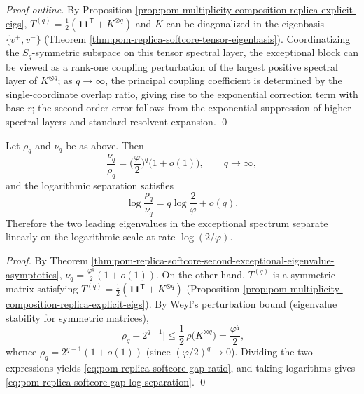 \begin{proof}[Proof outline]
By Proposition \ref{prop:pom-multiplicity-composition-replica-explicit-eigs},
\(
T^{(q)}=\frac12(\mathbf{1}\mathbf{1}^{\mathsf T}+K^{\otimes q})
\)
and \(K\) can be diagonalized in the eigenbasis \(\{v^+,v^-\}\) (Theorem \ref{thm:pom-replica-softcore-tensor-eigenbasis}).
Coordinatizing the \(S_q\)-symmetric subspace on this tensor spectral layer, the exceptional block can be viewed as a rank-one coupling perturbation of the largest positive spectral layer of \(K^{\otimes q}\);
as \(q\to\infty\), the principal coupling coefficient is determined by the single-coordinate overlap ratio, giving rise to the exponential correction term with base \(r\);
the second-order error follows from the exponential suppression of higher spectral layers and standard resolvent expansion. \qed
\end{proof}

\begin{theorem}\label{thm:pom-replica-softcore-gap-ratio-log-separation}
Let \(\rho_q\) and \(\nu_q\) be as above. Then
\begin{equation}\label{eq:pom-replica-softcore-gap-ratio}
\frac{\nu_q}{\rho_q}
=\Big(\frac{\varphi}{2}\Big)^{q}\Big(1+o(1)\Big),
\qquad q\to\infty,
\end{equation}
and the logarithmic separation satisfies
\begin{equation}\label{eq:pom-replica-softcore-gap-log-separation}
\log\frac{\rho_q}{\nu_q}
= q\log\frac{2}{\varphi}+o(q).
\end{equation}
Therefore the two leading eigenvalues in the exceptional spectrum separate linearly on the logarithmic scale at rate \(\log(2/\varphi)\).
\end{theorem}
\begin{proof}
By Theorem \ref{thm:pom-replica-softcore-second-exceptional-eigenvalue-asymptotics},
\(
\nu_q=\frac{\varphi^q}{2}(1+o(1))
\).
On the other hand, \(T^{(q)}\) is a symmetric matrix satisfying
\(
T^{(q)}=\frac12(\mathbf{1}\mathbf{1}^{\mathsf T}+K^{\otimes q})
\)
(Proposition \ref{prop:pom-multiplicity-composition-replica-explicit-eigs}).
By Weyl's perturbation bound (eigenvalue stability for symmetric matrices),
\[
\bigl|\rho_q-2^{q-1}\bigr|
\le \frac12\,\rho\!\bigl(K^{\otimes q}\bigr)
=\frac{\varphi^q}{2},
\]
whence \(\rho_q=2^{q-1}(1+o(1))\) (since \((\varphi/2)^q\to 0\)).
Dividing the two expressions yields \eqref{eq:pom-replica-softcore-gap-ratio},
and taking logarithms gives \eqref{eq:pom-replica-softcore-gap-log-separation}. \qed
\end{proof}

